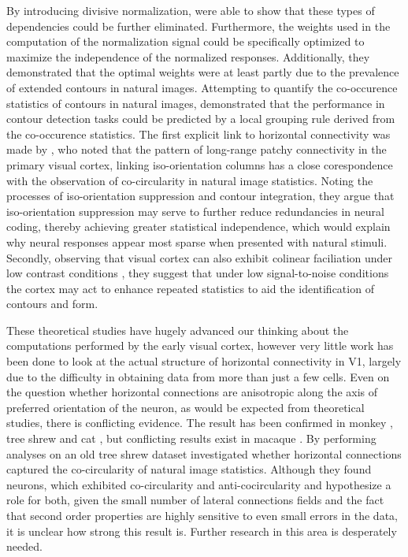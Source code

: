 By introducing divisive normalization, \cite{Schwartz2001a} were able
to show that these types of dependencies could be further
eliminated. Furthermore, the weights used in the computation of the
normalization signal could be specifically optimized to maximize the
independence of the normalized responses. Additionally, they
demonstrated that the optimal weights were at least partly due to the
prevalence of extended contours in natural images. Attempting to
quantify the co-occurence statistics of contours in natural images,
\cite{Geisler2001} demonstrated that the performance in contour
detection tasks could be predicted by a local grouping rule derived
from the co-occurence statistics. The first explicit link to
horizontal connectivity was made by \cite{Sigman2001}, who noted that
the pattern of long-range patchy connectivity in the primary visual
cortex, linking iso-orientation columns has a close corespondence with
the observation of co-circularity in natural image statistics. Noting
the processes of iso-orientation suppression and contour integration,
they argue that iso-orientation suppression may serve to further
reduce redundancies in neural coding, thereby achieving greater
statistical independence, which would explain why neural responses
appear most sparse when presented with natural stimuli. Secondly,
observing that visual cortex can also exhibit colinear faciliation
under low contrast conditions \citep{Sceniak1999, Kapadia1999}, they
suggest that under low signal-to-noise conditions the cortex may act
to enhance repeated statistics to aid the identification of contours
and form.

These theoretical studies have hugely advanced our thinking about the
computations performed by the early visual cortex, however very little
work has been done to look at the actual structure of horizontal
connectivity in V1, largely due to the difficulty in obtaining data
from more than just a few cells. Even on the question whether
horizontal connections are anisotropic along the axis of preferred
orientation of the neuron, as would be expected from theoretical
studies, there is conflicting evidence. The result has been confirmed
in monkey \citep{Sincich2001}, tree shrew \citep{Bosking1997} and cat
\citep{Schmidt1997}, but conflicting results exist in macaque
\cite{Angelucci2002}. By performing analyses on an old tree shrew
dataset \cite{Hunt2011} investigated whether horizontal connections
captured the co-circularity of natural image statistics. Although they
found neurons, which exhibited co-circularity and anti-cocircularity
and hypothesize a role for both, given the small number of lateral
connections fields and the fact that second order properties are
highly sensitive to even small errors in the data, it is unclear how
strong this result is. Further research in this area is desperately
needed.

